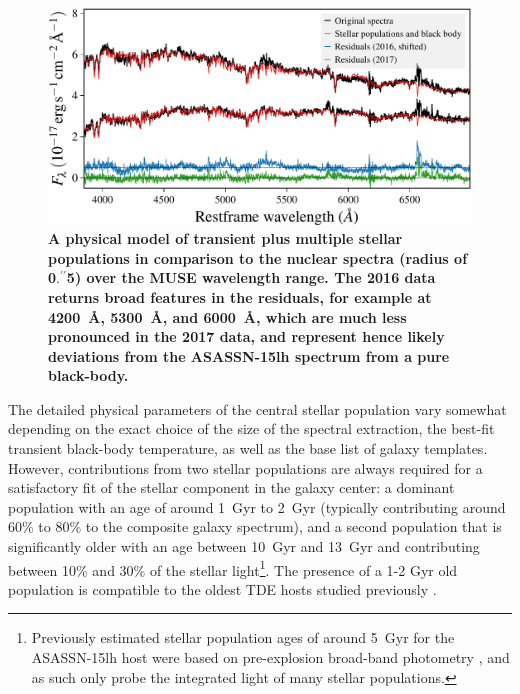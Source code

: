 \documentclass[traditabstract]{aa}
\newcommand{\farc}{\hbox{$.\!\!^{\prime\prime}$}}
\begin{document}
\begin{figure}
  \includegraphics[width=0.999\linewidth]{fig/Stargas_spec_all.pdf}
\caption{\textbf{A physical model of transient plus multiple stellar populations in comparison to the nuclear spectra (radius of 0\farc{5}) over the MUSE wavelength range. The 2016 data returns broad features in the residuals, for example at 4200~\AA, 5300~\AA, and 6000~\AA, which are much less pronounced in the 2017 data, and represent hence likely deviations from the ASASSN-15lh spectrum from a pure black-body.}}
\label{fig:stell_pop}
\end{figure}

The detailed physical parameters of the central stellar population vary somewhat depending on the exact choice of the size of the spectral extraction, the best-fit transient black-body temperature, as well as the base list of galaxy templates. However, contributions from two stellar populations are always required for a satisfactory fit of the stellar component in the galaxy center: a dominant population with an age of around 1~Gyr to 2~Gyr (typically contributing around 60\% to 80\% to the composite galaxy spectrum), and a second population that is significantly older with an age between 10~Gyr and 13~Gyr and contributing between 10\% and 30\% of the stellar light\footnote{Previously estimated stellar population ages of around 5~Gyr for the ASASSN-15lh host were based on pre-explosion broad-band photometry \citep{2015ATel.7843....1M, 2016NatAs...1E...2L,  2016Sci...351..257D}, and as such only probe the integrated light of many stellar populations.}. The presence of a 1-2 Gyr old population is compatible to the oldest TDE hosts studied previously \citep{2016ApJ...818L..21F, 2017ApJ...835..176F}. 
\end{document}
